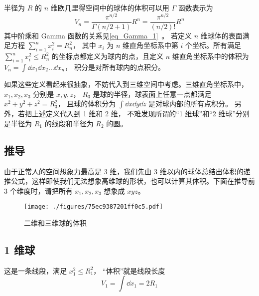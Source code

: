
半径为 $R$ 的 $n$ 维欧几里得空间中的球体的体积可以用 $\Gamma$ 函数表示为
\begin{equation}\label{eq_NSphV_8}
V_n = \frac{\pi^{n/2}}{\Gamma (n/2+1)} R^n = \frac{\pi^{n/2}}{(n/2)!} R^n
\end{equation}
其中阶乘和 Gamma 函数的关系见\autoref{eq_Gamma_1}~。 若定义 $n$ 维球体的表面满足方程 $\sum_{i=1}^n x_i^2 = R_n^2$， 其中 $x_i$ 为 $n$ 维直角坐标系中第 $i$ 个坐标。所有满足 $\sum_{i=1}^n x_i^2 \leqslant R_n^2$ 的坐标点都定义为球内的点，且定义 $n$ 维直角坐标系中的体积为 $V_n = \int \dd{x_1}\dd{x_2}\dots\dd{x_n}$， 积分是对所有球内的点积分。

如果这些定义看起来很抽象，不妨代入到三维空间中考虑。三维直角坐标系中， $x_1, x_2, x_3$ 分别是 $x,y,z$，  $R_3$ 是球的半径，球表面上任意一点都满足 $x^2 + y^2 + z^2 = R_3^2$， 且球的体积分为 $\int \dd{x}\dd{y}\dd{z}$ 是对球内部的所有点积分。 另外，若把上述定义代入到 1 维和 2 维， 不难发现所谓的“1 维球”和“2 维球”分别是半径为 $R_1$ 的线段和半径为 $R_2$ 的圆。

\subsection{推导}
由于正常人的空间想象力最高是 3 维，我们先由 3 维以内的球体总结出体积的递推公式，这样即使我们无法想象高维球的形状，也可以计算其体积。下面在推导前 3 个维度时，请把所有 $x_1, x_2, x_3$ 想象成 $xyz$。 
\begin{figure}[ht]
\centering
\texttt{[image: ./figures/75ec9387201ff0c5.pdf]}
\caption{二维和三维球的体积} \label{fig_NSphV_1}
\end{figure}
\subsection{1 维球}
这是一条线段，满足 $x_1^2 \leqslant R_1^2$， “体积”就是线段长度
\begin{equation}\label{eq_NSphV_1}
V_1 = \int \dd{x_1} = 2 R_1
\end{equation}
